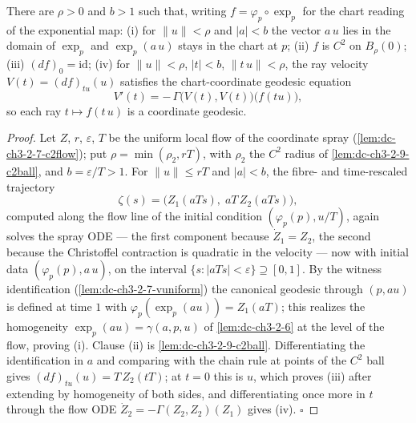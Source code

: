 \begin{lemma}
  \label{lem:dc-ch3-3-5-rayode}
  \leanok
  There are $\rho > 0$ and $b > 1$ such that, writing
  $f = \varphi_p \circ \exp_p$ for the chart reading of the exponential map:
  (i) for $\|u\| < \rho$ and $|a| < b$ the vector $a\,u$ lies in the domain of
  $\exp_p$ and $\exp_p(a\,u)$ stays in the chart at $p$;
  (ii) $f$ is $C^2$ on $B_\rho(0)$;
  (iii) $(df)_0 = \mathrm{id}$;
  (iv) for $\|u\| < \rho$, $|t| < b$, $\|t\,u\| < \rho$, the ray velocity
  $V(t) = (df)_{tu}(u)$ satisfies the chart-coordinate geodesic equation
  $$V'(t) = -\,\Gamma\big(V(t), V(t)\big)\big(f(tu)\big),$$
  so each ray $t \mapsto f(t\,u)$ is a coordinate geodesic.
\end{lemma}
\begin{proof}
  \leanok
  Let $Z$, $r$, $\varepsilon$, $T$ be the uniform local flow of the coordinate
  spray (\cref{lem:dc-ch3-2-7-c2flow}); put
  $\rho = \min(\rho_2, rT)$, with $\rho_2$ the $C^2$ radius of
  \cref{lem:dc-ch3-2-9-c2ball}, and $b = \varepsilon/T > 1$. For
  $\|u\| \le rT$ and $|a| < b$, the fibre- and time-rescaled trajectory
  $$\zeta(s) = \big(Z_1(aTs),\; aT\,Z_2(aTs)\big),$$
  computed along the flow line of the initial condition
  $(\varphi_p(p), u/T)$, again solves the spray ODE — the first component
  because $\dot Z_1 = Z_2$, the second because the Christoffel contraction is
  quadratic in the velocity — now with initial data $(\varphi_p(p), a\,u)$,
  on the interval $\{s : |aTs| < \varepsilon\} \supseteq [0,1]$. By the
  witness identification (\cref{lem:dc-ch3-2-7-vuniform}) the canonical
  geodesic through $(p, a u)$ is defined at time $1$ with
  $\varphi_p(\exp_p(a u)) = Z_1(aT)$; this realizes the homogeneity
  $\exp_p(a u) = \gamma(a, p, u)$ of \cref{lem:dc-ch3-2-6} at the level of
  the flow, proving (i). Clause (ii) is \cref{lem:dc-ch3-2-9-c2ball}.
  Differentiating the identification in $a$ and comparing with the chain
  rule at points of the $C^2$ ball gives $(df)_{tu}(u) = T\,Z_2(tT)$; at
  $t = 0$ this is $u$, which proves (iii) after extending by homogeneity of
  both sides, and differentiating once more in $t$ through the flow ODE
  $\dot Z_2 = -\Gamma(Z_2, Z_2)(Z_1)$ gives (iv). $\square$
\end{proof}

